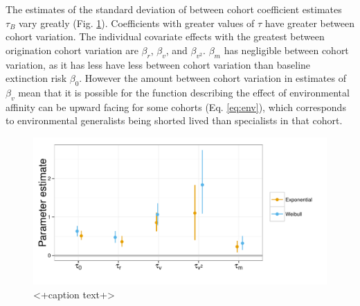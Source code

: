 \documentclass[12pt,letterpaper]{article}
\begin{document}
The estimates of the standard deviation of between cohort coefficient estimates \(\tau_{B}\) vary greatly (Fig. \ref{fig:tau}). Coefficients with greater values of \(\tau\) have greater between cohort variation. The individual covariate effects with the greatest between origination cohort variation are \(\beta_{r}\), \(\beta_{v}\), and \(\beta_{v^{2}}\). \(\beta_{m}\) has negligible between cohort variation, as it has less have less between cohort variation than baseline extinction risk \(\beta_{0}\). However the amount between cohort variation in estimates of \(\beta_{v}\) mean that it is possible for the function describing the effect of environmental affinity can be upward facing for some cohorts (Eq. \ref{eq:env}), which corresponds to environmental generalists being shorted lived than specialists in that cohort.
\begin{figure}[ht]
  \centering
  \includegraphics[height = 0.5\textheight,width=\textwidth,keepaspectratio=true]{figure/coef_var}
  \caption{<+caption text+>}
  \label{fig:tau}
\end{figure}
\end{document}
